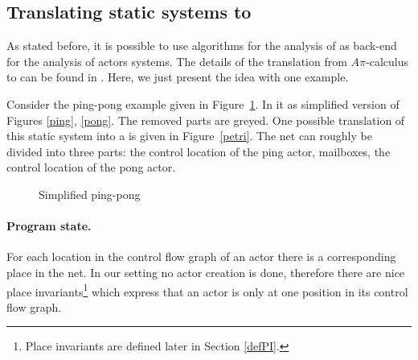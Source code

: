 \documentclass[a4paper]{report}
\numberwithin{algorithm}{chapter}
\begin{document}
\subsection{Translating static systems to \pns{}}

As stated before, it is possible to use algorithms for the analysis of \pns{} as back-end for the analysis of actors systems.
The details of the translation from $A\pi$-calculus to \pns{} can be found in \cite{DBLP:journals/njc/AmadioM02}.
Here, we just present the idea with one example.

Consider the ping-pong example given in Figure~\ref{simplePP}.
In it as simplified version of Figures \ref{ping}, \ref{pong}.
The removed parts are greyed.
One possible translation of this static system into a \pn{} is given in Figure~\ref{petri}.
The net can roughly be divided into three parts: the control location of the ping actor, mailboxes, the control location of the pong actor.

\begin{figure}[ht]
  \centering

  \caption{Simplified ping-pong}
  \label{simplePP}
\end{figure}

\paragraph{Program state.}
For each location in the control flow graph of an actor there is a corresponding place in the net.
In our setting no actor creation is done, therefore there are nice place invariants\footnote{Place invariants are defined later in Section \ref{defPI}.}
which express that an actor is only at one position in its control flow graph.
\end{document}
